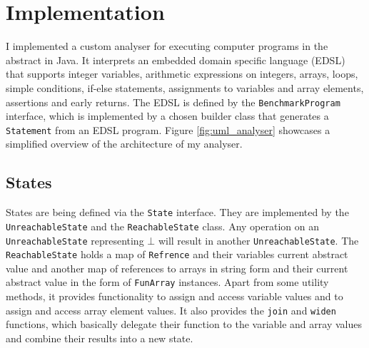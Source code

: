 \chapter{Implementation}\label{chap:implementation}

I implemented a custom analyser for executing computer programs in the abstract in Java. It interprets an embedded domain specific language (EDSL) that supports integer variables, arithmetic expressions on integers, arrays, loops, simple conditions, if-else statements, assignments to variables and array elements, assertions and early returns. The EDSL is defined by the \texttt{BenchmarkProgram} interface, which is implemented by a chosen builder class that generates a \texttt{Statement} from an EDSL program. Figure \ref{fig:uml_analyser} showcases a simplified overview of the architecture of my analyser.








\section{States}

States are being defined via the \texttt{State} interface. They are implemented by the \texttt{UnreachableState} and the \texttt{ReachableState} class. Any operation on an \texttt{UnreachableState} representing $\bot$ will result in another \texttt{Unreachable\allowbreak State}. The \texttt{ReachableState} holds a map of \texttt{Refrence} and their variables current abstract value and another map of references to arrays in string form and their current abstract value in the form of \texttt{FunArray} instances. Apart from some utility methods, it provides functionality to assign and access variable values and to assign and access array element values. It also provides the \texttt{join} and \texttt{widen} functions, which basically delegate their function to the variable and array values and combine their results into a new state. 









